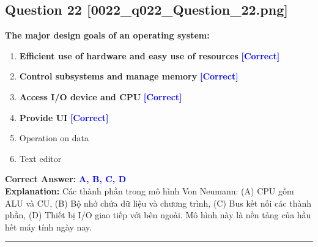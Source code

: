 \documentclass[11pt,a4paper]{article}
\begin{document}
\begin{minipage}{\textwidth}
\subsection*{Question 22 \quad \footnotesize{[0022\_q022\_Question\_22.png]}}
\noindent \textbf{The major design goals of an operating system:}

\begin{enumerate}[label=\Alph*.]
    \item \textbf{Efficient use of hardware and easy use of resources} \hfill \textcolor{blue}{\textbf{[Correct]}}
    \item \textbf{Control subsystems and manage memory} \hfill \textcolor{blue}{\textbf{[Correct]}}
    \item \textbf{Access I/O device and CPU} \hfill \textcolor{blue}{\textbf{[Correct]}}
    \item \textbf{Provide UI} \hfill \textcolor{blue}{\textbf{[Correct]}}
    \item Operation on data
    \item Text editor
\end{enumerate}

\noindent \textbf{Correct Answer:} \textcolor{blue}{\textbf{A, B, C, D}} \\[2pt]
\noindent \textbf{Explanation:} Các thành phần trong mô hình Von Neumann: (A) CPU gồm ALU và CU, (B) Bộ nhớ chứa dữ liệu và chương trình, (C) Bus kết nối các thành phần, (D) Thiết bị I/O giao tiếp với bên ngoài. Mô hình này là nền tảng của hầu hết máy tính ngày nay.

\par\vspace{0.3cm}
\hrule
\vspace{0.3cm}
\end{minipage}
\end{document}
